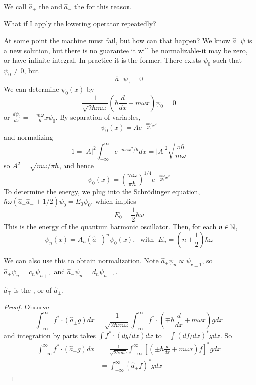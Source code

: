 \documentclass[12pt, a4paper, oneside, openright, titlepage]{book}
\begin{document}
We call $\hat{a}_+$ the  and $\hat{a}_-$ the  for this reason.

\begin{qst}
    What if I apply the lowering operator repeatedly?
\end{qst}

At some point the machine must fail, but how can that happen? We know $\hat{a}_-\psi$ is a new solution, but there is no guarantee it will be normalizable-it may be zero, or have infinite integral. In practice it is the former. There exists $\psi_0$ such that $\psi_0 \neq 0$, but $$\hat{a}_-\psi_0 = 0$$
We can determine $\psi_0(x)$ by $$\frac{1}{\sqrt{2\hbar m\omega}}\left(\hbar\frac{d}{dx} + m\omega x\right)\psi_0 = 0$$
or $\frac{d\psi_0}{dx} = -\frac{m\omega}{\hbar}x\psi_0$. By separation of variables, $$\psi_0(x) = Ae^{-\frac{m\omega}{2\hbar}x^2}$$
and normalizing $$1 = |A|^2\int_{-\infty}^{\infty}e^{-m\omega x^2/\hbar}dx = |A|^2\sqrt{\frac{\pi\hbar}{m\omega}}$$
so $A^2 = \sqrt{m\omega/\pi\hbar}$, and hence \begin{equation*}
    \boxed{\psi_0(x) = \left(\frac{m\omega }{\pi\hbar}\right)^{1/4}e^{-\frac{m\omega}{2\hbar}x^2}}
\end{equation*}
To determine the energy, we plug into the Schr\"{o}dinger equation, $\hbar\omega(\hat{a}_+\hat{a}_- +1/2)\psi_0 = E_0\psi_0$, which implies $$E_0 = \frac{1}{2}\hbar\omega$$
This is the  energy of the quantum harmonic oscillator. Then, for each $n \in \mathbb N$, $$\psi_n(x) = A_n(\hat{a}_+)^n\psi_0(x),\;\text{ with }\;E_n = \left(n+\frac{1}{2}\right)\hbar\omega$$

We can also use this to obtain normalization. Note $\hat{a}_{\pm}\psi_n \propto \psi_{n\pm 1}$, so $\hat{a}_+\psi_n = c_n\psi_{n+1}$ and $\hat{a}_-\psi_n = d_n\psi_{n-1}$.

\begin{prop}
    $\hat{a}_{\mp}$ is the , or  of $\hat{a}_{\pm}$.
\end{prop}
\begin{proof}
    Observe \begin{equation*}
        \int_{-\infty}^{\infty}f^*\cdot(\hat{a}_{\pm}g)dx = \frac{1}{\sqrt{2\hbar m\omega}}\int_{-\infty}^{\infty}f^*\cdot \left(\mp \hbar\frac{d}{dx} + m\omega x\right)gdx
    \end{equation*}
    and integration by parts takes $\int f^*\cdot (dg/dx)dx$ to $-\int(df/dx)^*gdx$. So \begin{align*}
        \int_{-\infty}^{\infty}f^*\cdot (\hat{a}_{\pm}g)dx &= \frac{1}{\sqrt{2\hbar m\omega}}\int_{-\infty}^{\infty}\left[\left(\pm\hbar\frac{d}{dx} + m\omega x\right)f\right]^*gdx \\
        &= \int_{-\infty}^{\infty}(\hat{a}_{\mp}f)^*gdx
    \end{align*}
\end{proof}
\end{document}
